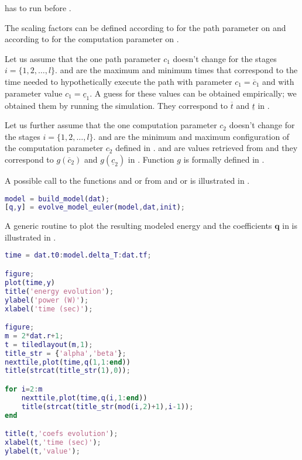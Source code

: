  has to run before .

The scaling factors can be defined according to  for the path parameter on  and according to  for the computation parameter on .

Let us assume that the one path parameter $c_1$ doesn't change for the stages $i=\{1,2,\dots,l\}$.  and  are the maximum and minimum times that correspond to the time needed to hypothetically execute the path with parameter $c_1=\overline{c}_1$ and with parameter value $c_1=\underline{c}_1$. A guess for these values can be obtained empirically; we obtained them by running the simulation. They correspond to $\overline{t}$ and $\underline{t}$ in .

Let us further assume that the one computation parameter $c_2$ doesn't change for the stages $i=\{1,2,\dots,l\}$.  and  are the minimum and maximum configuration of the computation parameter $c_2$ defined in .  and  are values retrieved from \powprof{} and they correspond to $g(\overline{c}_2)$ and $g(\underline{c}_2)$ in . Function $g$ is formally defined in .

A possible call to the functions  and  or  from  and  or  is illustrated in .

\begin{lstlisting}[language=Matlab,caption={[Example to build and evolve the model]An example to build a differential model and evolve it over a horizon $N$.},captionpos=b,label=lst:call_model]
model = build_model(dat);
[q,y] = evolve_model_euler(model,dat,init);
\end{lstlisting}

A generic routine to plot the resulting modeled energy and the coefficients $\mathbf{q}$ in  is illustrated in .

\begin{lstlisting}[language=Matlab,caption={[Plot of the modeled energy and coefficients]A generic polotting routine for them modeled energy and coefficients evolution.},captionpos=b,label=lst:model_plot]
time = dat.t0:model.delta_T:dat.tf;

figure;
plot(time,y)
title('energy evolution');
ylabel('power (W)');
xlabel('time (sec)');

figure;
m = 2*dat.r+1;
t = tiledlayout(m,1);
title_str = {'alpha','beta'};
nexttile,plot(time,q(1,1:end))
title(strcat(title_str(1),0));

for i=2:m
    nexttile,plot(time,q(i,1:end))
    title(strcat(title_str(mod(i,2)+1),i-1));
end

title(t,'coefs evolution');
xlabel(t,'time (sec)');
ylabel(t,'value');
\end{lstlisting}

